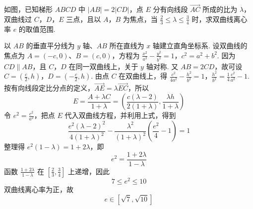 \begin{problem}
如图，已知梯形 \(ABCD\) 中 \(|AB|=2|CD|\)，点 \(E\) 分有向线段 \(\overrightarrow{AC}\) 所成的比为 \(\lambda\)，双曲线过 \(C\)，\(D\)，\(E\) 三点，且以 \(A\)，\(B\) 为焦点，当 \(\frac{2}{3}\leqslant\lambda\leqslant\frac{3}{4}\) 时，求双曲线离心率 \(e\) 的取值范围.


\begin{solution}
以 \(AB\) 的垂直平分线为 \(y\) 轴、\(AB\) 所在直线为 \(x\) 轴建立直角坐标系. 设双曲线的焦点为 \(A=(-c,0)\)、\(B=(c,0)\)，方程为
\(\frac{x^2}{a^2}-\frac{y^2}{b^2}=1\)，\(c^2=a^2+b^2\).
因为 \(CD\parallel AB\)，且 \(C\)，\(D\) 在同一双曲线上，关于 \(y\) 轴对称. 又 \(AB=2CD\)，故可设
\(C=\left(\frac c2,h\right)\)，\(D=\left(-\frac c2,h\right)\).
由点 \(C\) 在双曲线上，得
\(\frac{c^2}{4a^2}-\frac{h^2}{b^2}=1\)，\(\frac{h^2}{b^2}=\frac14\frac{c^2}{a^2}-1\).
按有向线段定比分点的定义，\(\overrightarrow{AE}=\lambda\overrightarrow{EC}\)，所以
\[
E=\frac{A+\lambda C}{1+\lambda}
=\left(\frac{c(\lambda-2)}{2(1+\lambda)},\frac{\lambda h}{1+\lambda}\right)
\]
令 \(e^2=\frac{c^2}{a^2}\)，把点 \(E\) 代入双曲线方程，并利用上式，得到
\[
\frac{e^2(\lambda-2)^2}{4(1+\lambda)^2}
-\frac{\lambda^2}{(1+\lambda)^2}\left(\frac{e^2}{4}-1\right)=1
\]
整理得 \(e^2(1-\lambda)=1+2\lambda\)，即
\[
e^2=\frac{1+2\lambda}{1-\lambda}
\]
函数 \(\frac{1+2\lambda}{1-\lambda}\) 在 \(\left[\frac23,\frac34\right]\) 上递增，因此
\[
7\leqslant e^2\leqslant10
\]
双曲线离心率为正，故
\[
e\in[\sqrt7,\sqrt{10}]
\]
\end{solution}
\end{problem}
